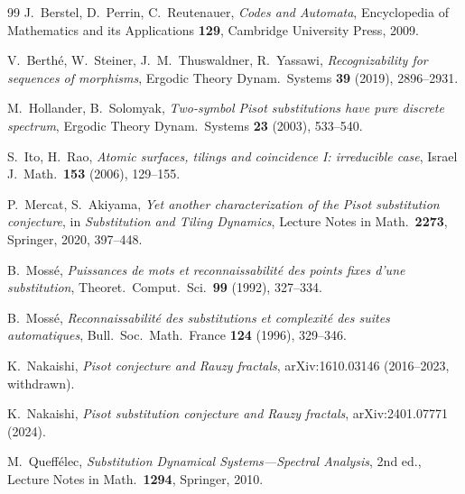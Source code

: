 \documentclass[11pt]{article}
\theoremstyle{plain}
\theoremstyle{definition}
\theoremstyle{remark}
\begin{document}
\begin{thebibliography}{99}
J.~Berstel, D.~Perrin, C.~Reutenauer,
\emph{Codes and Automata},
Encyclopedia of Mathematics and its Applications \textbf{129},
Cambridge University Press, 2009.

V.~Berth\'e, W.~Steiner, J.~M.~Thuswaldner, R.~Yassawi,
\emph{Recognizability for sequences of morphisms},
Ergodic Theory Dynam.\ Systems \textbf{39} (2019), 2896--2931.

M.~Hollander, B.~Solomyak,
\emph{Two-symbol Pisot substitutions have pure discrete spectrum},
Ergodic Theory Dynam.\ Systems \textbf{23} (2003), 533--540.

S.~Ito, H.~Rao,
\emph{Atomic surfaces, tilings and coincidence I: irreducible case},
Israel J.\ Math.\ \textbf{153} (2006), 129--155.

P.~Mercat, S.~Akiyama,
\emph{Yet another characterization of the Pisot substitution conjecture},
in \emph{Substitution and Tiling Dynamics}, Lecture Notes in Math.\ \textbf{2273}, Springer, 2020, 397--448.

B.~Moss\'e,
\emph{Puissances de mots et reconnaissabilit\'e des points fixes d'une substitution},
Theoret.\ Comput.\ Sci.\ \textbf{99} (1992), 327--334.

B.~Moss\'e,
\emph{Reconnaissabilit\'e des substitutions et complexit\'e des suites automatiques},
Bull.\ Soc.\ Math.\ France \textbf{124} (1996), 329--346.

K.~Nakaishi,
\emph{Pisot conjecture and Rauzy fractals},
arXiv:1610.03146 (2016--2023, withdrawn).

K.~Nakaishi,
\emph{Pisot substitution conjecture and Rauzy fractals},
arXiv:2401.07771 (2024).

M.~Queff\'elec,
\emph{Substitution Dynamical Systems---Spectral Analysis},
2nd ed., Lecture Notes in Math.\ \textbf{1294}, Springer, 2010.

\end{thebibliography}
\end{document}
